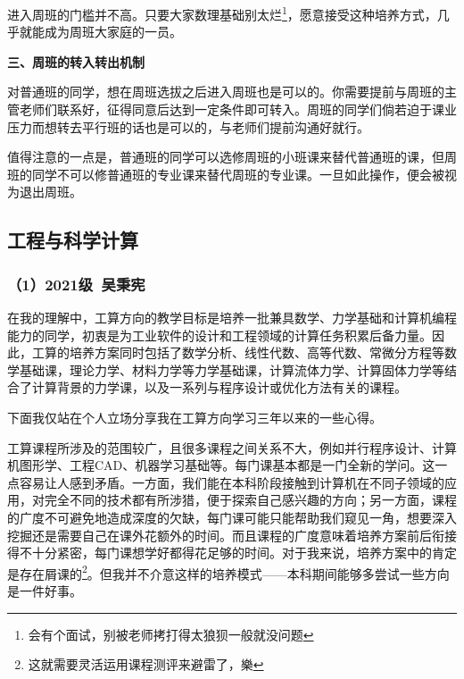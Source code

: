 \documentclass[11pt,oneside]{book}
\begin{document}
\vspace{10pt}

进入周班的门槛并不高。只要大家数理基础别太烂\footnote{会有个面试，别被老师拷打得太狼狈一般就没问题}，愿意接受这种培养方式，几乎就能成为周班大家庭的一员。

\vspace{10pt}

\textbf{\textbf{三、周班的转入转出机制}}

对普通班的同学，想在周班选拔之后进入周班也是可以的。你需要提前与周班的主管老师们联系好，征得同意后达到一定条件即可转入。周班的同学们倘若迫于课业压力而想转去平行班的话也是可以的，与老师们提前沟通好就行。

\vspace{10pt}

值得注意的一点是，普通班的同学可以选修周班的小班课来替代普通班的课，但周班的同学不可以修普通班的专业课来替代周班的专业课。一旦如此操作，便会被视为退出周班。

\subsection{工程与科学计算}
\subsubsection{（1）2021级\ 吴秉宪}

在我的理解中，工算方向的教学目标是培养一批兼具数学、力学基础和计算机编程能力的同学，初衷是为工业软件的设计和工程领域的计算任务积累后备力量。因此，工算的培养方案同时包括了数学分析、线性代数、高等代数、常微分方程等数学基础课，理论力学、材料力学等力学基础课，计算流体力学、计算固体力学等结合了计算背景的力学课，以及一系列与程序设计或优化方法有关的课程。

\vspace{10pt}

下面我仅站在个人立场分享我在工算方向学习三年以来的一些心得。

\vspace{10pt}

工算课程所涉及的范围较广，且很多课程之间关系不大，例如并行程序设计、计算机图形学、工程CAD、机器学习基础等。每门课基本都是一门全新的学问。这一点容易让人感到矛盾。一方面，我们能在本科阶段接触到计算机在不同子领域的应用，对完全不同的技术都有所涉猎，便于探索自己感兴趣的方向；另一方面，课程的广度不可避免地造成深度的欠缺，每门课可能只能帮助我们窥见一角，想要深入挖掘还是需要自己在课外花额外的时间。而且课程的广度意味着培养方案前后衔接得不十分紧密，每门课想学好都得花足够的时间。对于我来说，培养方案中的肯定是存在屑课的\footnote{这就需要灵活运用课程测评来避雷了，樂}。但我并不介意这样的培养模式——本科期间能够多尝试一些方向是一件好事。
\end{document}
